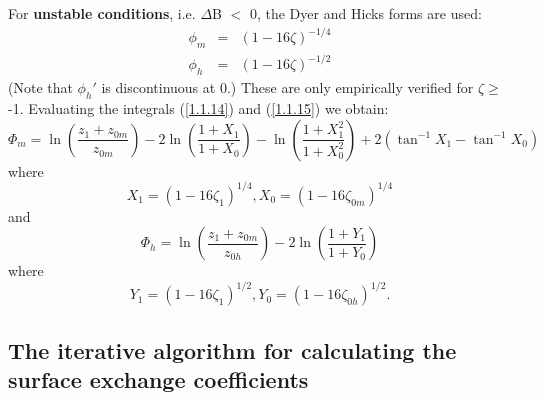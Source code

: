 \documentclass{UMDP_article}
\begin{document}
For \textbf{unstable conditions}, i.e. $\Delta $B $<$ 0, the Dyer and
Hicks forms \cite[]{dyer1974} are used:
\begin{eqnarray}
  \phi _m&=&(1 - 16\zeta  )^{-1/4}
  \label{1.3.15} \\
  \phi _h&=&(1 - 16\zeta  )^{-1/2}
  \label{1.3.16}
\end{eqnarray}
(Note that $\phi _{h}\prime $ is discontinuous at 0.) These are only
empirically verified for $\zeta \ge $ -1. Evaluating the integrals
(\ref{1.1.14}) and (\ref{1.1.15}) we obtain:
\begin{equation}
  \Phi _m = \ln  \left( {\frac{ z_1 +  z_{0m} }{ z_{0m} }} \right) - 2 \ln  \left( {\frac{1 +  X_1 }{1 +  X_0 }} \right) - \ln  \left( {\frac{1 +  X_1^2 }{1 +  X_0^2 }} \right)+ 2 \left( { {\tan }^{-1}  X_1 -  {\tan }^{-1}  X_0 } \right)
  \label{1.3.17}
\end{equation}
where
\begin{equation}
  X_1 = (1 - 16 \zeta _1  )^{1/4} ,  X_0 = (1 - 16 \zeta _{0m}  )^{1/4}
  \label{1.3.18}
\end{equation}
and
\begin{equation}
  \Phi _h = \ln  \left( {\frac{ z_1 +  z_{0m} }{ z_{0h} }} \right) - 2 \ln  \left( {\frac{1 +  Y_1 }{1 +  Y_0 }} \right)
  \label{1.3.19}
\end{equation}
where
\begin{equation}
  Y_1 = (1 - 16 \zeta _1  )^{1/2} ,  Y_0 = (1 - 16 \zeta _{0h}  )^{1/2}.
  \label{1.3.20}
\end{equation}

\subsection{The iterative algorithm for calculating the surface
  exchange coefficients}\label{section_1.4}
\end{document}
